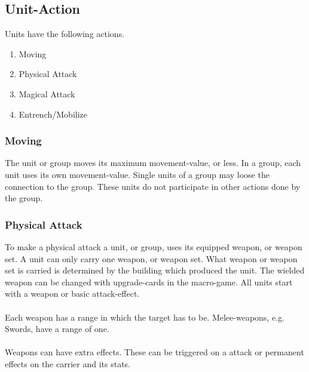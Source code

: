 \documentclass[a5paper,pagesize,10pt,bibtotoc,pointlessnumbers,
normalheadings,DIV=9,twoside=false]{scrbook}
\begin{document}
\subsection{Unit-Action}
Units have the following actions.

\begin{enumerate}
\item Moving
\item Physical Attack
\item Magical Attack
\item Entrench/Mobilize
\end{enumerate}

\subsubsection{Moving}
The unit or group moves its maximum movement-value, or less.
In a group, each unit uses its own movement-value. Single units of a group may loose the connection to the group. These units do not participate in other actions done by the group.

\subsubsection{Physical Attack}
To make a physical attack a unit, or group, uses its equipped weapon, or weapon set. 
A unit can only carry one weapon, or weapon set.
What weapon or weapon set is carried is determined by the building which produced the unit. The wielded weapon can be changed with upgrade-cards in the macro-game.
All units start with a weapon or basic attack-effect.\\
\\
Each weapon has a range in which the target has to be. Melee-weapons, e.g. Swords, have a range of one.\\
\\
Weapons can have extra effects. These can be triggered on a attack or permanent effects on the carrier and its stats.\\
\end{document}
